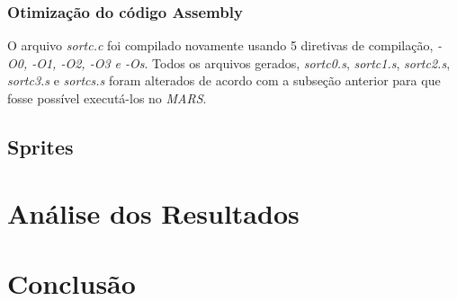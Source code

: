 \documentclass[12pt]{article}
\begin{document}
\subsubsection{Otimização do código Assembly}
\label{subsubsec:ot}

O arquivo \textit{sortc.c} foi compilado novamente usando 5 diretivas de compilação, \textit{-O0, -O1, -O2, -O3 e -Os}. Todos os arquivos gerados, \textit{sortc0.s}, \textit{sortc1.s}, \textit{sortc2.s}, \textit{sortc3.s} e \textit{sortcs.s} foram alterados de acordo com a subseção anterior para que fosse possível executá-los no \textit{MARS}.

\subsection{Sprites}
\label{subsec:sprites}

\section{Análise dos Resultados}
\label{sec:Resultados}

\section{Conclusão}
\label{sec:Conclusao}


  
\end{document}
